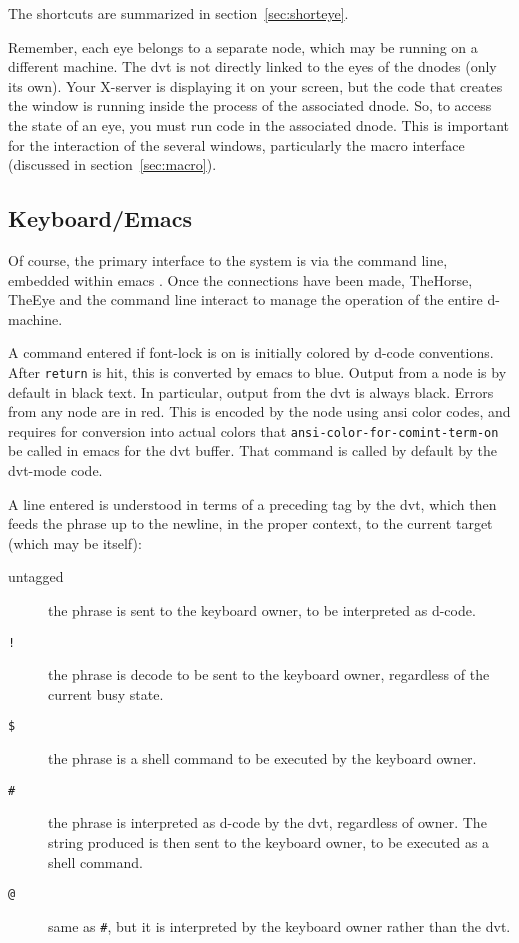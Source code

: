 \documentclass[12pt]{article}
\begin{document}
The shortcuts are summarized in section~\ref{sec:shorteye}.

Remember, each eye belongs to a separate node, which may be running
on a different machine. The dvt is not directly linked to the eyes of
the dnodes (only its own).  Your X-server is displaying it on your
screen, but the code that creates the window is running inside the
process of the associated dnode.  So, to access the state of an eye,
you must run code in the associated dnode.  This is important for the
interaction of the several windows, particularly the macro interface
(discussed in section~\ref{sec:macro}).

\subsection{Keyboard/Emacs}
\label{sec:keyboard}

Of course, the primary interface to the system is via the command
line, embedded within emacs \citep{dvt-emacs}. Once the connections
have been made, TheHorse, TheEye and the command line interact to
manage the operation of the entire d-machine.

A command entered if font-lock is on is initially colored by d-code
conventions. After \verb$return$ is hit, this is converted by emacs to
blue. Output from a node is by default in black text. In particular,
output from the dvt is always black. Errors from any node are in red.
This is encoded by the node using ansi color codes, and requires for
conversion into actual colors that
\verb$ansi-color-for-comint-term-on$ be called in emacs for the dvt
buffer. That command is called by default by the dvt-mode code.

A line entered is understood in terms of a preceding tag by the dvt,
which then feeds the phrase up to the newline, in the proper context,
to the current target (which may be itself):
\begin{description}
  \item[untagged] the phrase is sent to the keyboard owner, to be
  interpreted as d-code.
  \item[\texttt{!}] the phrase is decode to be sent to the keyboard
  owner, regardless of the current busy state.
  \item[\texttt{\$}] the phrase is a shell command to be executed by
  the keyboard owner.
  \item[\texttt{\#}] the phrase is interpreted as d-code by the dvt,
  regardless of owner. The string produced is then sent to the
  keyboard owner, to be executed as a shell command.
  \item[\texttt{@}] same as \verb$#$, but it is interpreted by the
  keyboard owner rather than the dvt.
\end{description}
\end{document}
